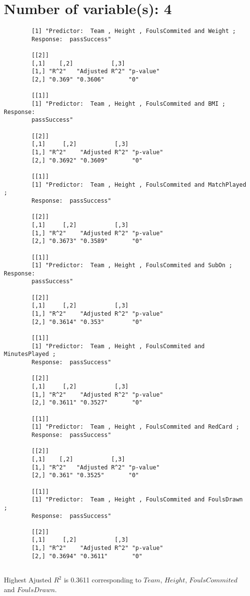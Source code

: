\documentclass[12pt]{article}
\begin{document}
	\section{Number of variable(s): 4}
	\begin{verbatim}
		[1] "Predictor:  Team , Height , FoulsCommited and Weight ; 
		Response:  passSuccess"
		
		[[2]]
		[,1]    [,2]           [,3]     
		[1,] "R^2"   "Adjusted R^2" "p-value"
		[2,] "0.369" "0.3606"       "0"      
		
		[[1]]
		[1] "Predictor:  Team , Height , FoulsCommited and BMI ; Response:  
		passSuccess"
		
		[[2]]
		[,1]     [,2]           [,3]     
		[1,] "R^2"    "Adjusted R^2" "p-value"
		[2,] "0.3692" "0.3609"       "0"      
		
		[[1]]
		[1] "Predictor:  Team , Height , FoulsCommited and MatchPlayed ; 
		Response:  passSuccess"
		
		[[2]]
		[,1]     [,2]           [,3]     
		[1,] "R^2"    "Adjusted R^2" "p-value"
		[2,] "0.3673" "0.3589"       "0"      
		
		[[1]]
		[1] "Predictor:  Team , Height , FoulsCommited and SubOn ; Response:  
		passSuccess"
		
		[[2]]
		[,1]     [,2]           [,3]     
		[1,] "R^2"    "Adjusted R^2" "p-value"
		[2,] "0.3614" "0.353"        "0"      
		
		[[1]]
		[1] "Predictor:  Team , Height , FoulsCommited and MinutesPlayed ; 
		Response:  passSuccess"
		
		[[2]]
		[,1]     [,2]           [,3]     
		[1,] "R^2"    "Adjusted R^2" "p-value"
		[2,] "0.3611" "0.3527"       "0"      
		
		[[1]]
		[1] "Predictor:  Team , Height , FoulsCommited and RedCard ; 
		Response:  passSuccess"
		
		[[2]]
		[,1]    [,2]           [,3]     
		[1,] "R^2"   "Adjusted R^2" "p-value"
		[2,] "0.361" "0.3525"       "0"      
		
		[[1]]
		[1] "Predictor:  Team , Height , FoulsCommited and FoulsDrawn ; 
		Response:  passSuccess"
		
		[[2]]
		[,1]     [,2]           [,3]     
		[1,] "R^2"    "Adjusted R^2" "p-value"
		[2,] "0.3694" "0.3611"       "0"   
		
	\end{verbatim}
Highest Ajusted $ R^2 $ is 0.3611 corresponding to $ Team $, $ Height $, $ FoulsCommited $ and $ FoulsDrawn $.
	
\end{document}
